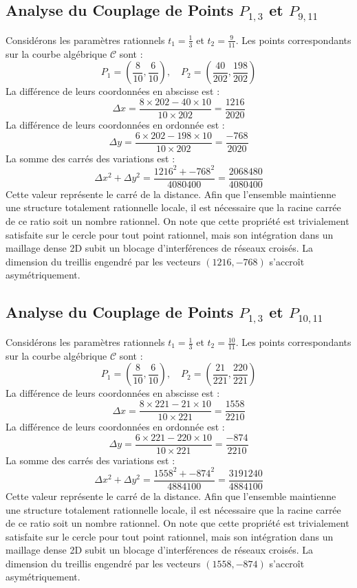 \documentclass[12pt, a4paper]{article}
\begin{document}
\subsection{Analyse du Couplage de Points $P_{1,3}$ et $P_{9,11}$}
Considérons les paramètres rationnels $t_1 = \frac{1}{3}$ et $t_2 = \frac{9}{11}$.
Les points correspondants sur la courbe algébrique $\mathcal{C}$ sont :
$$ P_1 = \left( \frac{8}{10}, \frac{6}{10} \right), \quad P_2 = \left( \frac{40}{202}, \frac{198}{202} \right) $$
La différence de leurs coordonnées en abscisse est :
$$ \Delta x = \frac{8 \times 202 - 40 \times 10}{10 \times 202} = \frac{1216}{2020} $$
La différence de leurs coordonnées en ordonnée est :
$$ \Delta y = \frac{6 \times 202 - 198 \times 10}{10 \times 202} = \frac{-768}{2020} $$
La somme des carrés des variations est :
$$ \Delta x^2 + \Delta y^2 = \frac{ 1216^2 + -768^2 }{ 4080400 } = \frac{ 2068480 }{ 4080400 } $$
Cette valeur représente le carré de la distance. Afin que l'ensemble maintienne une structure totalement rationnelle locale, il est nécessaire que la racine carrée de ce ratio soit un nombre rationnel. On note que cette propriété est trivialement satisfaite sur le cercle pour tout point rationnel, mais son intégration dans un maillage dense 2D subit un blocage d'interférences de réseaux croisés. La dimension du treillis engendré par les vecteurs $( 1216, -768 )$ s'accroît asymétriquement.


\subsection{Analyse du Couplage de Points $P_{1,3}$ et $P_{10,11}$}
Considérons les paramètres rationnels $t_1 = \frac{1}{3}$ et $t_2 = \frac{10}{11}$.
Les points correspondants sur la courbe algébrique $\mathcal{C}$ sont :
$$ P_1 = \left( \frac{8}{10}, \frac{6}{10} \right), \quad P_2 = \left( \frac{21}{221}, \frac{220}{221} \right) $$
La différence de leurs coordonnées en abscisse est :
$$ \Delta x = \frac{8 \times 221 - 21 \times 10}{10 \times 221} = \frac{1558}{2210} $$
La différence de leurs coordonnées en ordonnée est :
$$ \Delta y = \frac{6 \times 221 - 220 \times 10}{10 \times 221} = \frac{-874}{2210} $$
La somme des carrés des variations est :
$$ \Delta x^2 + \Delta y^2 = \frac{ 1558^2 + -874^2 }{ 4884100 } = \frac{ 3191240 }{ 4884100 } $$
Cette valeur représente le carré de la distance. Afin que l'ensemble maintienne une structure totalement rationnelle locale, il est nécessaire que la racine carrée de ce ratio soit un nombre rationnel. On note que cette propriété est trivialement satisfaite sur le cercle pour tout point rationnel, mais son intégration dans un maillage dense 2D subit un blocage d'interférences de réseaux croisés. La dimension du treillis engendré par les vecteurs $( 1558, -874 )$ s'accroît asymétriquement.
\end{document}
